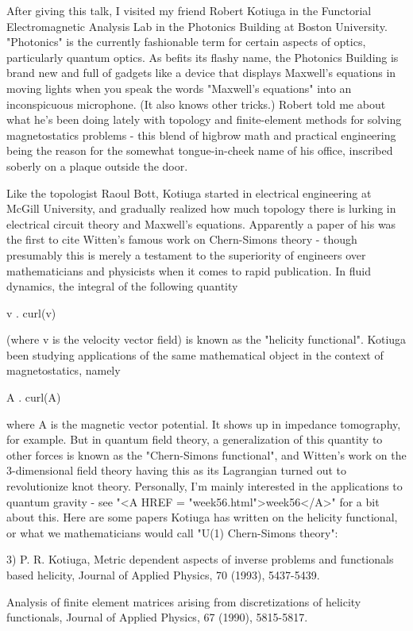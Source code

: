 After giving this talk, I visited my friend Robert Kotiuga in the
Functorial Electromagnetic Analysis Lab in the Photonics Building at
Boston University.  "Photonics" is the currently fashionable term for
certain aspects of optics, particularly quantum optics.  As befits its
flashy name, the Photonics Building is brand new and full of gadgets
like a device that displays Maxwell's equations in moving lights when
you speak the words "Maxwell's equations" into an inconspicuous
microphone.  (It also knows other tricks.)  Robert told me about what
he's been doing lately with topology and finite-element methods for
solving magnetostatics problems - this blend of higbrow math and
practical engineering being the reason for the somewhat
tongue-in-cheek name of his office, inscribed soberly on a plaque
outside the door.

Like the topologist Raoul Bott, Kotiuga started in electrical
engineering at McGill University, and gradually realized how much
topology there is lurking in electrical circuit theory and Maxwell's
equations.  Apparently a paper of his was the first to cite Witten's
famous work on Chern-Simons theory - though presumably this is
merely a testament to the superiority of engineers over mathematicians
and physicists when it comes to rapid publication.  In fluid dynamics,
the integral of the following quantity

v . curl(v) 

(where v is the velocity vector field) is known as the "helicity
functional".  Kotiuga been studying applications of the same mathematical
object in the context of magnetostatics, namely

A . curl(A) 

where A is the magnetic vector potential.  It shows up in impedance
tomography, for example.  But in quantum field theory, a
generalization of this quantity to other forces is known as the
"Chern-Simons functional", and Witten's work on the 3-dimensional
field theory having this as its Lagrangian turned out to revolutionize
knot theory.  Personally, I'm mainly interested in the applications to
quantum gravity - see "<A HREF = "week56.html">week56</A>" for a bit about this.  Here are some
papers Kotiuga has written on the helicity functional, or what we
mathematicians would call "U(1) Chern-Simons theory":

3) P. R. Kotiuga, Metric dependent aspects of inverse problems and
functionals based helicity, Journal of Applied Physics, 70 (1993),
5437-5439.

Analysis of finite element matrices arising from discretizations of
helicity functionals, Journal of Applied Physics, 67 (1990),
5815-5817.

